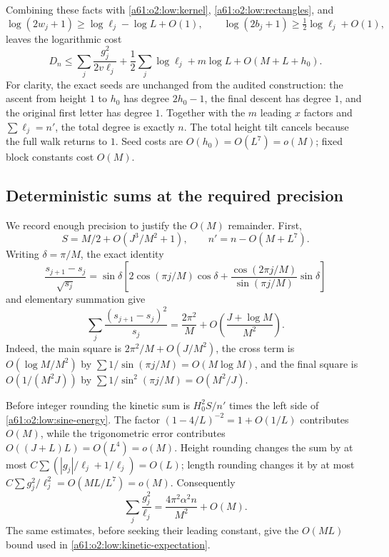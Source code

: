 \documentclass[11pt,letterpaper]{article}
\numberwithin{equation}{section}
\theoremstyle{remark}\newtheorem{remark}[theorem]{Remark}
\begin{document}
Combining these facts with \eqref{a61:o2:low:kernel},
\eqref{a61:o2:low:rectangles}, and
\[
 \log(2w_j+1)\ge\log\ell_j-\log L+O(1),\qquad
 \log(2b_j+1)\ge\tfrac12\log\ell_j+O(1),
\]
leaves the logarithmic cost
\begin{equation}\label{a61:o2:low:cost}
 D_n\le\sum_j\frac{g_j^2}{2v\ell_j}
       +\frac12\sum_j\log\ell_j+m\log L
       +O(M+L+h_0).
\end{equation}
For clarity, the exact seeds are unchanged from the audited
construction: the ascent from height $1$ to $h_0$ has degree
$2h_0-1$, the final descent has degree $1$, and the original first
letter has degree $1$. Together with the $m$ leading $x$ factors and
$\sum\ell_j=n'$, the total degree is exactly $n$.
The total height tilt cancels because the full walk returns to $1$.
Seed costs are $O(h_0)=O(L^7)=o(M)$; fixed block constants cost $O(M)$.

\subsection{Deterministic sums at the required precision}

We record enough precision to justify the $O(M)$ remainder. First,
\[
 S=M/2+O(J^3/M^2+1),\qquad n'=n-O(M+L^7).
\]
Writing $\delta=\pi/M$, the exact identity
\[
 \frac{s_{j+1}-s_j}{\sqrt{s_j}}
 =\sin\delta\left[
  2\cos(\pi j/M)\cos\delta
  +\frac{\cos(2\pi j/M)}{\sin(\pi j/M)}\sin\delta\right]
\]
and elementary summation give
\begin{equation}\label{a61:o2:low:sine-energy}
 \sum_j\frac{(s_{j+1}-s_j)^2}{s_j}
 =\frac{2\pi^2}{M}
  +O\left(\frac{J+\log M}{M^2}\right).
\end{equation}
Indeed, the main square is $2\pi^2/M+O(J/M^2)$, the cross term is
$O(\log M/M^2)$ by
$\sum1/\sin(\pi j/M)=O(M\log M)$, and the final square is
$O(1/(M^2J))$ by
$\sum1/\sin^2(\pi j/M)=O(M^2/J)$.

Before integer rounding the kinetic sum is $H_0^2S/n'$ times the left
side of \eqref{a61:o2:low:sine-energy}. The factor
$(1-4/L)^{-2}=1+O(1/L)$ contributes $O(M)$, while the trigonometric
error contributes $O((J+L)L)=O(L^4)=o(M)$. Height rounding changes the
sum by at most
$C\sum(|g_j|/\ell_j+1/\ell_j)=O(L)$; length rounding changes it by at
most $C\sum g_j^2/\ell_j^2=O(ML/L^7)=o(M)$. Consequently
\begin{equation}\label{a61:o2:low:kinetic-sum}
 \sum_j\frac{g_j^2}{\ell_j}
   =\frac{4\pi^2\alpha^2n}{M^2}+O(M).
\end{equation}
The same estimates, before seeking their leading constant, give the
$O(ML)$ bound used in \eqref{a61:o2:low:kinetic-expectation}.
\end{document}
